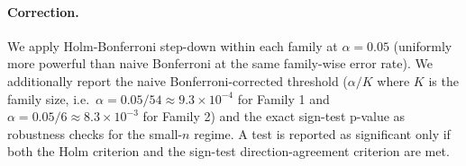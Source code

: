 \paragraph{Correction.}
We apply Holm-Bonferroni step-down within each family at $\alpha = 0.05$ (uniformly more powerful than naive Bonferroni at the same family-wise error rate). We additionally report the naive Bonferroni-corrected threshold ($\alpha / K$ where $K$ is the family size, i.e.\ $\alpha = 0.05/54 \approx 9.3 \times 10^{-4}$ for Family 1 and $\alpha = 0.05/6 \approx 8.3 \times 10^{-3}$ for Family 2) and the exact sign-test p-value as robustness checks for the small-$n$ regime. A test is reported as significant only if both the Holm criterion and the sign-test direction-agreement criterion are met.
